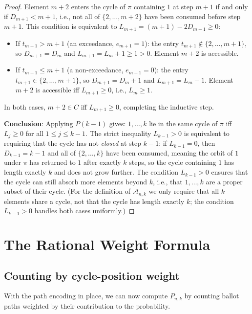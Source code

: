 \documentclass[12pt,a4paper]{article}
\theoremstyle{definition}
\begin{document}
\begin{proof}
Element $m+2$ enters the cycle of $\pi$ containing $1$ at step
$m+1$ if and only if $D_{m+1}<m+1$, i.e., not all of
$\{2,\dots,m+2\}$ have been consumed before step $m+1$.
This condition is equivalent to $L_{m+1} = (m+1)-2D_{m+1} \ge 0$:
\begin{itemize}
  \item If $t_{m+1} > m+1$ (an exceedance, $e_{m+1}=1$): the entry
    $t_{m+1}\notin\{2,\dots,m+1\}$, so $D_{m+1}=D_m$ and
    $L_{m+1}=L_m+1\ge 1>0$.  Element $m+2$ is accessible.
  \item If $t_{m+1} \le m+1$ (a non-exceedance, $e_{m+1}=0$): the
    entry $t_{m+1}\in\{2,\dots,m+1\}$, so $D_{m+1}=D_m+1$ and
    $L_{m+1}=L_m-1$.  Element $m+2$ is accessible iff $L_{m+1}\ge 0$,
    i.e., $L_m\ge 1$.
\end{itemize}
In both cases, $m+2\in C$ iff $L_{m+1}\ge 0$, completing the
inductive step.

\textbf{Conclusion}: Applying $P(k-1)$ gives: $1,\dots,k$ lie in
the same cycle of $\pi$ iff $L_j\ge 0$ for all $1\le j\le k-1$.
The strict inequality $L_{k-1}>0$ is equivalent to requiring that
the cycle has not \emph{closed} at step $k-1$: if $L_{k-1}=0$, then
$D_{k-1}=k-1$ and all of $\{2,\dots,k\}$ have been consumed, meaning
the orbit of $1$ under $\pi$ has returned to $1$ after exactly $k$
steps, so the cycle containing $1$ has length exactly $k$ and does
not grow further.  The condition $L_{k-1}>0$ ensures that the cycle
can still absorb more elements beyond $k$, i.e., that $1,\dots,k$
are a proper subset of their cycle.  (For the definition of
$\mathcal{A}_{n,k}$ we only require that all $k$ elements share a
cycle, not that the cycle has length exactly $k$; the condition
$L_{k-1}>0$ handles both cases uniformly.)
\end{proof}

\section{The Rational Weight Formula}
\label{sec:weight}

\subsection{Counting by cycle-position weight}

With the path encoding in place, we can now compute $P_{n,k}$ by
counting ballot paths weighted by their contribution to the probability.
\end{document}
